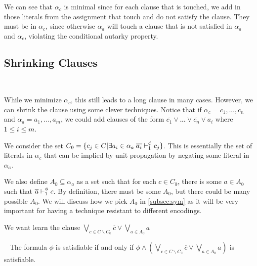 We can see that $\alpha_c$ is minimal since for each clause that is touched, we add in those literals from the assignment that touch and do not satisfy the clause. They must be in $\alpha_c$, since otherwise $\alpha_a$ will touch a clause that is not satisfied in $\alpha_a$ and $\alpha_c$, violating the conditional autarky property.

\subsection{Shrinking Clauses}~\label{subsec:shrinking}

While we minimize $\alpha_c$, this still leads to a long clause in many cases. However, we can shrink the clause using some clever techniques. Notice that if $\alpha_c = c_1, ..., c_n$ and $\alpha_a = a_1, ..., a_m$, we could add clauses of the form $\overline{c_1} \lor ... \lor \overline{c_n} \lor a_i$ where $1 \leq i \leq m$.


We consider the set $C_0 = \{c_j \in C| \exists a_i \in \alpha_a \; \overline{a_i} \vdash_1^\phi c_j \}$. This is essentially the set of literals in $\alpha_c$ that can be implied by unit propagation by negating some literal in $\alpha_a$.

We also define $A_0 \subseteq \alpha_a$ as a set such that for each $c \in C_0$, there is some $a \in A_0$ such that $\overline{a} \vdash_1^\phi c$. By definition, there must be some $A_0$, but there could be many possible $A_0$. We will discuss how we pick $A_0$ in \autoref{subsec:sym} as it will be very important for having a technique resistant to different encodings. 



We want learn the clause $\bigvee_{c \in C \backslash C_0} \overline{c} \lor \bigvee_{a \in A_0} a$


\begin{theorem}~\label{thm:shrunkgbcequisat}
    The formula $\phi$ is satisfiable if and only if $\phi \land (\bigvee_{c \in C \backslash C_0} \overline{c} \lor \bigvee_{a \in A_0} a)$ is satisfiable.
\end{theorem}

